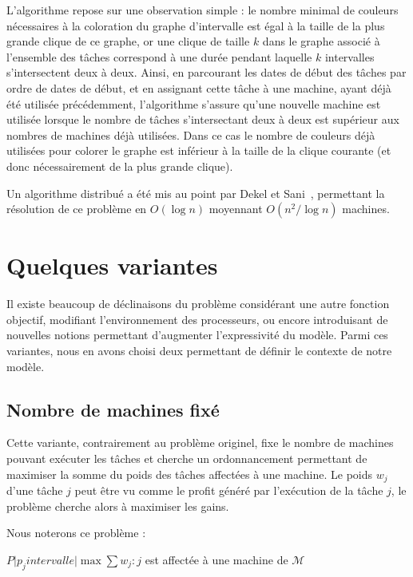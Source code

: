 \documentclass[a4paper,11pt]{report}
\begin{document}
L'algorithme repose sur une observation simple : le nombre minimal de couleurs nécessaires à la
coloration du graphe d'intervalle est égal à la taille de la plus grande clique de ce graphe, or une
clique de taille $k$ dans le graphe associé à l'ensemble des tâches correspond à une durée pendant
laquelle $k$ intervalles s'intersectent deux à deux. Ainsi, en parcourant les dates de début des tâches par
ordre de dates de début, et en assignant cette tâche à une machine, ayant déjà été utilisée
précédemment, l'algorithme s'assure qu'une nouvelle machine est utilisée lorsque le nombre de
tâches s'intersectant deux à deux est supérieur aux nombres de machines déjà utilisées. Dans ce cas
le nombre de couleurs déjà utilisées pour colorer le graphe est inférieur à la taille de la clique
courante (et donc nécessairement de la plus grande clique).

Un algorithme distribué a été mis au point par Dekel et Sani~\cite{dekel1983parallel}, permettant la
résolution de ce problème en $O(\log n)$ moyennant $O(n^2 / \log n)$ machines.

\section{Quelques variantes}

Il existe beaucoup de déclinaisons du problème \bisched{} considérant une autre fonction objectif,
modifiant l'environnement des processeurs, ou encore introduisant de nouvelles notions permettant
d'augmenter l'expressivité du modèle. Parmi ces variantes, nous en avons choisi deux permettant de
définir le contexte de notre modèle.

\subsection{Nombre de machines fixé}

Cette variante, contrairement au problème originel, fixe le nombre de machines pouvant exécuter les
tâches et cherche un ordonnancement permettant de maximiser la somme du poids des tâches affectées à
une machine. Le poids $w_j$ d'une tâche $j$ peut être vu comme le profit généré par l'exécution de
la tâche $j$, le problème cherche alors à maximiser les gains.

Nous noterons ce problème :
\begin{center}
    $P \Big| p_j intervalle \Big| \max \sum w_j : j$ est affectée à une machine de $\mathcal{M}$
\end{center}
\end{document}
